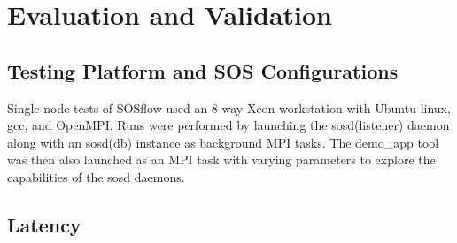 
\section{Evaluation and Validation}


%
%





%
%




\subsection{Testing Platform and SOS Configurations}



Single node tests of SOSflow used an 8-way Xeon workstation with
Ubuntu linux, gcc, and OpenMPI.
%
Runs were performed by launching the sosd(listener) daemon along with
an sosd(db) instance as background MPI tasks.
%
The demo\_app tool was then also launched as an MPI task with varying
parameters to explore the capabilities of the sosd daemons.




\subsection{Latency}

